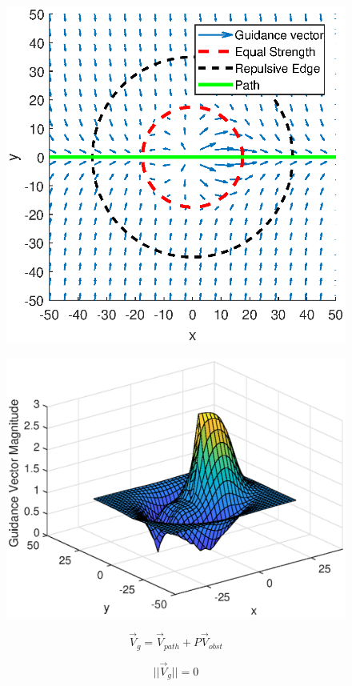 \documentclass[conf]{new-aiaa}
\begin{document}
\begin{figure}[H]
	\centering
	\includegraphics[width=0.7\linewidth]{Figures/methods/summedQuiver}
	\caption{}
	\label{fig:summedquiver}
\end{figure}


\begin{figure}[H]
	\centering
	\includegraphics[width=0.7\linewidth]{Figures/methods/summedMagnitudeSurf}
	\caption{}
	\label{fig:summedmagnitudesurf}
\end{figure}



\begin{equation}
\label{eq:singularityCondition}
\overrightarrow{V}_g = \overrightarrow{V}_{path} + P\overrightarrow{V}_{obst}
\end{equation}

\begin{equation}
\label{eq:singularityCondition}
||\overrightarrow{V}_g || = 0
\end{equation}
\end{document}
